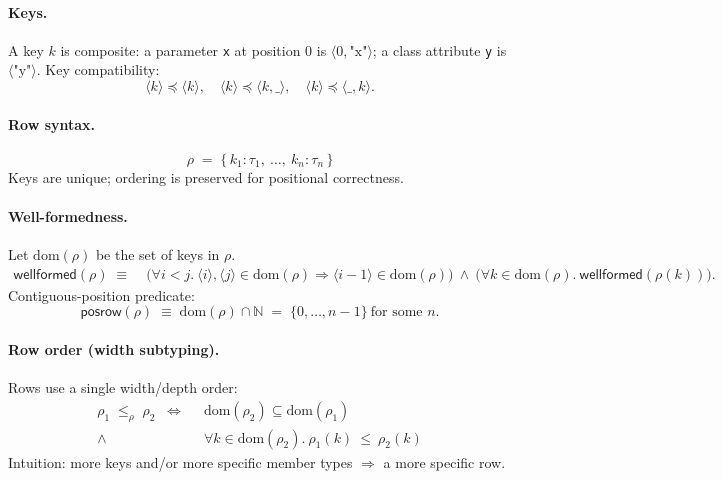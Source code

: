 \paragraph{Keys.}
A key $k$ is composite: a parameter \texttt{x} at position $0$ is $\langle 0,\text{"x"} \rangle$; a class attribute \texttt{y} is $\langle \text{"y"} \rangle$.
Key compatibility:
\[
\langle k \rangle \preccurlyeq \langle k \rangle,\quad
\langle k \rangle \preccurlyeq \langle k, \_ \rangle,\quad
\langle k \rangle \preccurlyeq \langle \_, k \rangle.
\]

\paragraph{Row syntax.}
\[
\rho \;=\; \{\, k_1 : \tau_1,\ \dots,\ k_n : \tau_n \,\}
\]
Keys are unique; ordering is preserved for positional correctness.

\paragraph{Well-formedness.}
Let $\mathrm{dom}(\rho)$ be the set of keys in $\rho$.
\begin{align}
\mathsf{wellformed}(\rho) \;\equiv\;&
\big(\forall i<j.\ \langle i\rangle,\langle j\rangle \in \mathrm{dom}(\rho) \Rightarrow \langle i{-}1\rangle \in \mathrm{dom}(\rho)\big)\ \wedge\ 
\big(\forall k\in\mathrm{dom}(\rho).\ \mathsf{wellformed}(\rho(k))\big).
\end{align}
Contiguous-position predicate:
\[
\mathsf{posrow}(\rho) \;\equiv\; \mathrm{dom}(\rho)\cap\mathbb{N} \;=\; \{0,\dots,n{-}1\}\ \text{for some } n.
\]

\paragraph{Row order (width subtyping).}
Rows use a single width/depth order:
\begin{align*}
\rho_1 \;\le_\rho\; \rho_2 \;\;\iff\;\;
& \mathrm{dom}(\rho_2)\subseteq \mathrm{dom}(\rho_1) \\
\wedge \; & \forall k\in\mathrm{dom}(\rho_2).\ \rho_1(k)\ \le\ \rho_2(k)
\end{align*}
Intuition: more keys and/or more specific member types $\Rightarrow$ a more specific row.

